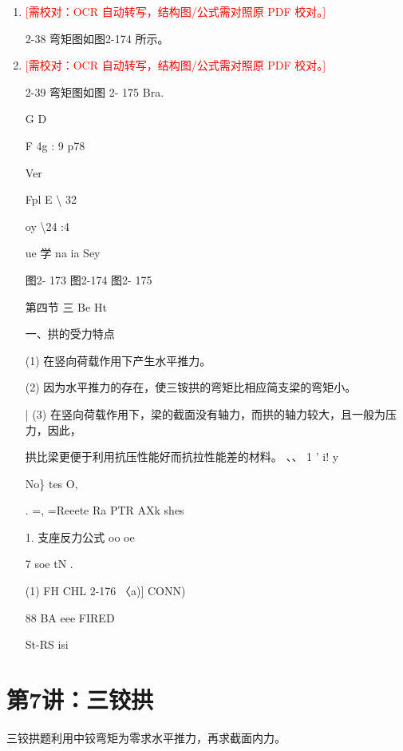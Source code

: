 \documentclass[UTF8,12pt,a4paper,openany]{ctexbook}
\newcommand{\TODO}[1]{\textcolor{red}{[需校对：#1]}}
\begin{document}
\begin{enumerate}[label=\textbf{\arabic*.},leftmargin=2em]
\item \TODO{OCR 自动转写，结构图/公式需对照原 PDF 校对。}\par 2-38 弯矩图如图2-174 所示。
\item \TODO{OCR 自动转写，结构图/公式需对照原 PDF 校对。}\par 2-39 弯矩图如图 2- 175 Bra.\par G                                                   D\par F           4g       :       9                p78\par Ver\par Fpl     E                  \textbackslash{}      32\par oy \textbackslash{}24                            :4\par ue 学          na         ia Sey\par 图2- 173                 图2-174              图2- 175\par 第四节 三 Be Ht\par 一、拱的受力特点\par (1) 在竖向荷载作用下产生水平推力。\par (2) 因为水平推力的存在，使三铵拱的弯矩比相应简支梁的弯矩小。\par |        (3) 在竖向荷载作用下，梁的截面没有轴力，而拱的轴力较大，且一般为压力，因此，\par 拱比梁更便于利用抗压性能好而抗拉性能差的材料。                                        、、 1 ' i! y\par No\} tes O,\par .       =, =Reeete Ra PTR AXk                         shes\par 1. 支座反力公式                                                          oo      oe\par 7 soe tN   .\par (1) FH CHL 2-176 〈a)]                                                    CONN)\par 88                                                                          BA eee FIRED\par St-RS isi
\end{enumerate}
\chapter{第7讲：三铰拱}
\begin{tcolorbox}[title=解析总览]
三铰拱题利用中铰弯矩为零求水平推力，再求截面内力。
\end{tcolorbox}
\end{document}
